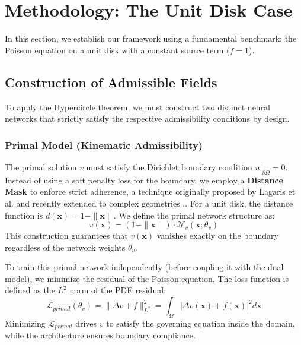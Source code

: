 \documentclass[12pt, a4paper]{article}
\begin{document}
\section{Methodology: The Unit Disk Case}
In this section, we establish our framework using a fundamental benchmark: the Poisson equation on a unit disk with a constant source term ($f=1$).

\subsection{Construction of Admissible Fields}
To apply the Hypercircle theorem, we must construct two distinct neural networks that strictly satisfy the respective admissibility conditions by design.

\subsubsection{Primal Model (Kinematic Admissibility)}
The primal solution $v$ must satisfy the Dirichlet boundary condition $u|_{\partial \Omega} = 0$. Instead of using a soft penalty loss for the boundary, we employ a \textbf{Distance Mask} to enforce strict adherence, a technique originally proposed by Lagaris et al. \cite{lagaris1998artificial} and recently extended to complex geometries \cite{berg2018unified}.. For a unit disk, the distance function is $d(\mathbf{x}) = 1 - \|\mathbf{x}\|$. We define the primal network structure as:
\begin{equation}
    v(\mathbf{x}) = (1 - \|\mathbf{x}\|) \cdot \mathcal{N}_v(\mathbf{x}; \theta_v)
\end{equation}
This construction guarantees that $v(\mathbf{x})$ vanishes exactly on the boundary regardless of the network weights $\theta_v$.

To train this primal network independently (before coupling it with the dual model), we minimize the residual of the Poisson equation. The loss function is defined as the $L^2$ norm of the PDE residual:
\begin{equation} \label{eq:primal_loss}
    \mathcal{L}_{primal}(\theta_v) = \| \Delta v + f \|^2_{L^2} = \int_{\Omega} | \Delta v(\mathbf{x}) + f(\mathbf{x}) |^2 d\mathbf{x}
\end{equation}
Minimizing $\mathcal{L}_{primal}$ drives $v$ to satisfy the governing equation inside the domain, while the architecture ensures boundary compliance.
\end{document}
